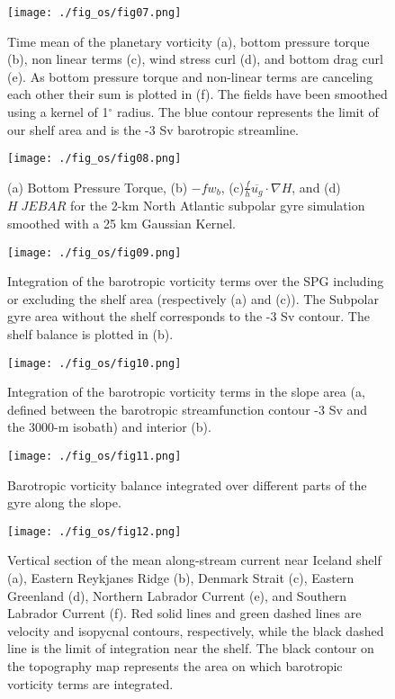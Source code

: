 \documentclass{ametsoc}
\begin{document}
\begin{figure}[t]
\centerline{\texttt{[image: ./fig\_os/fig07.png]}}
\caption{ Time mean of the planetary vorticity (a), bottom pressure torque (b), non linear terms (c), wind stress curl (d), and bottom drag curl (e). As bottom pressure torque and non-linear terms are canceling each other their sum is plotted in (f). The fields have been smoothed using a kernel of 1$^{\circ}$ radius. The blue contour represents the limit of our shelf area and is the -3 Sv barotropic streamline. }
\label{spatial_BV}
\end{figure} 

\begin{figure}[t]
\centerline{\texttt{[image: ./fig\_os/fig08.png]}}
\caption{(a) Bottom Pressure Torque, (b) $-fw_b$, (c)$\frac{f}{h} \overline{u_g} \cdot \nabla H$, and (d) $H \; JEBAR$ for the 2-km North Atlantic subpolar gyre simulation smoothed with a 25 km Gaussian Kernel.}
\label{decomp_bpt}
\end{figure} 

\begin{figure}[t]
\centerline{\texttt{[image: ./fig\_os/fig09.png]}}
\caption{Integration of the barotropic vorticity terms over the SPG including or excluding the shelf area (respectively (a) and (c)). The Subpolar gyre area without the shelf corresponds to the -3 Sv contour. The shelf balance is plotted in (b). }
\label{intgyre_BV}
\end{figure} 

\begin{figure}[t]
\centerline{\texttt{[image: ./fig\_os/fig10.png]}}
\caption{Integration of the barotropic vorticity terms in the slope area (a, defined between the barotropic streamfunction contour -3 Sv and the 3000-m isobath) and interior (b).}
\label{int_bound_inner_BV}
\end{figure} 

\begin{figure}[t]
\centerline{\texttt{[image: ./fig\_os/fig11.png]}}
\caption{Barotropic vorticity balance integrated over different parts of the gyre along the slope.}
\label{bv_zones}
\end{figure}

\begin{figure}[t]
\centerline{\texttt{[image: ./fig\_os/fig12.png]}}
\caption{Vertical section of the mean along-stream current near Iceland shelf (a), Eastern Reykjanes Ridge (b), Denmark Strait (c), Eastern Greenland (d), Northern Labrador Current (e), and Southern Labrador Current (f). Red solid lines and green dashed lines are velocity and isopycnal contours, respectively, while the black dashed line is the limit of integration near the shelf. The black contour on the topography map represents the area on which barotropic vorticity terms are integrated.}
\label{section_vit}
\end{figure} 
\end{document}
